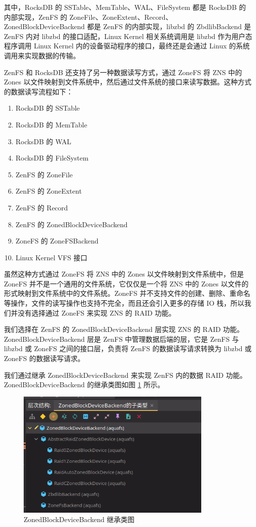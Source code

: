 其中，RocksDB 的 SSTable、MemTable、WAL、FileSystem 都是 RocksDB 的内部实现，ZenFS 的 ZoneFile、ZoneExtent、Record、ZonedBlockDeviceBackend 都是 ZenFS 的内部实现，libzbd 的 ZbdlibBackend 是 ZenFS 内对 libzbd 的接口适配，Linux Kernel 相关系统调用是 libzbd 作为用户态程序调用 Linux Kernel 内的设备驱动程序的接口，最终还是会通过 Linux 的系统调用来实现数据的传输。

ZenFS 和 RocksDB 还支持了另一种数据读写方式，通过 ZoneFS 将 ZNS 中的 Zones 以文件映射到文件系统中，然后通过文件系统的接口来读写数据。这种方式的数据读写流程如下：

\begin{enumerate}
  \item RocksDB 的 SSTable
  \item RocksDB 的 MemTable
  \item RocksDB 的 WAL
  \item RocksDB 的 FileSystem
  \item ZenFS 的 ZoneFile
  \item ZenFS 的 ZoneExtent
  \item ZenFS 的 Record
  \item ZenFS 的 ZonedBlockDeviceBackend
  \item ZoneFS 的 ZoneFSBackend
  \item Linux Kernel VFS 接口
\end{enumerate}

虽然这种方式通过 ZoneFS 将 ZNS 中的 Zones 以文件映射到文件系统中，但是 ZoneFS 并不是一个通用的文件系统，它仅仅是一个将 ZNS 中的 Zones 以文件的形式映射到文件系统中的文件系统。ZoneFS 并不支持文件的创建、删除、重命名等操作，文件的读写操作也支持不完全，而且还会引入更多的存储 IO 栈，所以我们并没有选择通过 ZoneFS 来实现 ZNS 的 RAID 功能。

我们选择在 ZenFS 的 ZonedBlockDeviceBackend 层实现 ZNS 的 RAID 功能。ZonedBlockDeviceBackend 层是 ZenFS 中管理数据后端的层，它是 ZenFS 与 libzbd 或 ZoneFS 之间的接口层，负责将 ZenFS 的数据读写请求转换为 libzbd 或 ZoneFS 的数据读写请求。

我们通过继承 ZonedBlockDeviceBackend 来实现 ZenFS 内的数据 RAID 功能。ZonedBlockDeviceBackend 的继承类图如图 \ref{raid-layers} 所示。

\begin{figure}[htbp]
  \centering
  \includegraphics[width=0.85\textwidth]{fig/raid-layers.png}
  \caption{ ZonedBlockDeviceBackend 继承类图 }
  \label{raid-layers}
\end{figure}

